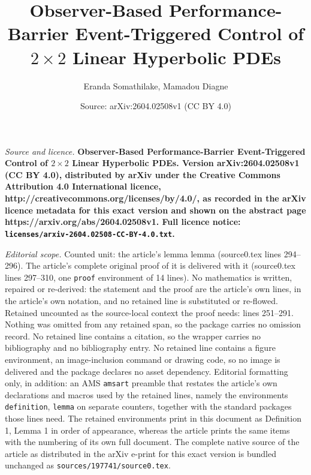 \documentclass[10pt,a4paper]{amsart}
\title{\LARGE \bf Observer-Based Performance-Barrier Event-Triggered Control of $2\times2$ Linear Hyperbolic PDEs}
\author{Eranda Somathilake, Mamadou Diagne}
\date{Source: arXiv:2604.02508v1 (CC BY 4.0)}
\begin{document}
\maketitle

\noindent\emph{Source and licence.} \LARGE \bf Observer-Based Performance-Barrier Event-Triggered Control of $2\times2$ Linear Hyperbolic PDEs. Version arXiv:2604.02508v1 (CC BY 4.0), distributed by arXiv under the Creative Commons Attribution 4.0 International licence, http://creativecommons.org/licenses/by/4.0/, as recorded in the arXiv licence metadata for this exact version and shown on the abstract page https://arxiv.org/abs/2604.02508v1. Full licence notice: \texttt{licenses/arxiv-2604.02508-CC-BY-4.0.txt}.\par\smallskip

\noindent\textit{Editorial scope.} Counted unit: the article's lemma lemma (source0.tex lines 294--296). The article's complete original proof of it is delivered with it (source0.tex lines 297--310, one \texttt{proof} environment of 14 lines). No mathematics is written, repaired or re-derived: the statement and the proof are the article's own lines, in the article's own notation, and no retained line is substituted or re-flowed.  Retained uncounted as the source-local context the proof needs: lines 251--291.  Nothing was omitted from any retained span, so the package carries no omission record.  No retained line contains a citation, so the wrapper carries no bibliography and no bibliography entry.  No retained line contains a figure environment, an image-inclusion command or drawing code, so no image is delivered and the package declares no asset dependency.  Editorial formatting only, in addition: an AMS \texttt{amsart} preamble that restates the article's own declarations and macros used by the retained lines, namely the environments \texttt{definition}, \texttt{lemma} on separate counters, together with the standard packages those lines need.  The retained environments print in this document as Definition 1, Lemma 1 in order of appearance, whereas the article prints the same items with the numbering of its own full document.  The complete native source of the article as distributed in the arXiv e-print for this exact version is bundled unchanged as \texttt{sources/197741/source0.tex}.
\end{document}
